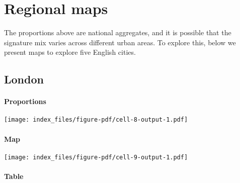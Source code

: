 \documentclass[
  letterpaper,
  DIV=11,
  numbers=noendperiod,
  oneside]{scrartcl}
\let\oldparagraph\paragraph
\renewcommand{\paragraph}[1]{\oldparagraph{#1}\mbox{}}
\begin{document}
\hypertarget{regional-maps}{%
\section{Regional maps}\label{regional-maps}}

The proportions above are national aggregates, and it is possible that
the signature mix varies across different urban areas. To explore this,
below we present maps to explore five English cities.

\hypertarget{london}{%
\subsection{London}\label{london}}

\hypertarget{proportions}{%
\paragraph{Proportions}\label{proportions}}

\texttt{[image: index\_files/figure-pdf/cell-8-output-1.pdf]}

\hypertarget{map}{%
\paragraph{Map}\label{map}}

\texttt{[image: index\_files/figure-pdf/cell-9-output-1.pdf]}

\hypertarget{table}{%
\paragraph{Table}\label{table}}
\end{document}
